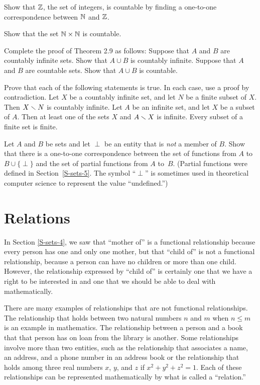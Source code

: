 \begin{exercises}
\problem Show that ${\mathbb Z}$, the set of integers, is countable by finding
a one-to-one correspondence between ${\mathbb N}$ and ${\mathbb Z}$.

\problem Show that the set ${\mathbb N}\times{\mathbb N}$ is countable.

\problem Complete the proof of Theorem 2.9 as follows:
\ppart Suppose that $A$ and $B$ are countably infinite sets.
Show that $A\cup B$ is countably infinite.
\ppart Suppose that $A$ and $B$ are countable sets.
Show that $A\cup B$ is countable.

\problem Prove that each of the following statements is true.
In each case, use a proof by contradiction.
\ppart Let $X$ be a countably infinite set, and let $N$ be a finite
subset of $X$.  Then $X\smallsetminus N$ is countably infinite.
\ppart Let $A$ be an infinite set, and let $X$ be a subset of $A$.
Then at least one of the sets $X$ and $A\smallsetminus X$ is infinite.
\ppart Every subset of a finite set is finite.

\problem Let $A$ and $B$ be sets and let $\perp$ be an entity that is \emph{not}
a member of $B$.  Show that there is a one-to-one correspondence between
the set of functions from $A$ to $B\cup\{\perp\}$ and the set of
partial functions from $A$ to~$B$.  (Partial functions were defined
in Section~\ref{S-sets-5}.  The symbol ``$\perp$'' is sometimes used in
theoretical computer science to represent the value ``undefined.'')

\end{exercises}

\section{Relations}\label{S-sets-7}

In Section \ref{S-sets-4}, we saw that ``mother of'' is a functional
relationship because every person has one and only one mother,
but that ``child of'' is not a functional relationship,
because a person can have no children or more than one child.
However, the relationship expressed by ``child of'' is certainly 
one that we have a right to be interested in and one
that we should be able to deal with mathematically.

There are many examples of relationships that are not functional
relationships.  The relationship that holds between two 
natural numbers $n$ and $m$ when $n\le m$ is an example in mathematics.
The relationship between a person and a book that that person has
on loan from the library is another.  Some relationships
involve more than two entities, such as the relationship
that associates a name, an address, and a phone number in
an address book or the relationship that holds among three
real numbers $x$, $y$, and $z$ if $x^2+y^2+z^2=1$.  Each of
these relationships can be represented mathematically by
what is called a ``relation.''

